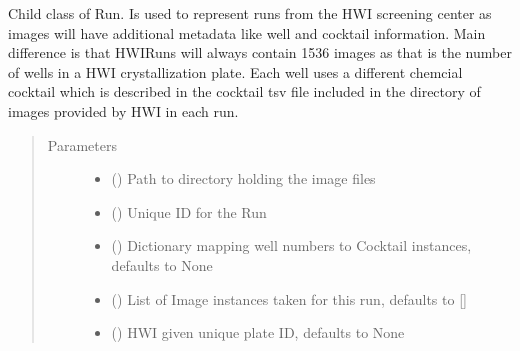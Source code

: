 \documentclass[letterpaper,10pt,english]{sphinxmanual}
\begin{document}
\begin{fulllineitems}
\begin{fulllineitems}
\label{\detokenize{polo.crystallography:polo.crystallography.run.HWIRun.AllOWED_PLOTS}}
Child class of Run. Is used to represent runs from the HWI screening center
as images will have additional metadata like well and cocktail information.
Main difference is that HWIRuns will always contain 1536 images as that is
the number of wells in a HWI crystallization plate. Each well uses a
different chemcial cocktail which is described in the cocktail tsv file
included in the directory of images provided by HWI in each run.
\begin{quote}\begin{description}
\item[{Parameters}] \leavevmode\begin{itemize}
\item {} 
 () \textendash{} Path to directory holding the image files

\item {} 
 () \textendash{} Unique ID for the Run

\item {} 
 (\sphinxstyleliteralemphasis{\sphinxupquote{, }}) \textendash{} Dictionary mapping well numbers to
Cocktail instances, defaults to None

\item {} 
 (\sphinxstyleliteralemphasis{\sphinxupquote{, }}) \textendash{} List of Image instances taken for this run, defaults to {[}{]}

\item {} 
 (\sphinxstyleliteralemphasis{\sphinxupquote{, }}) \textendash{} HWI given unique plate ID, defaults to None


\end{itemize}
\end{description}
\end{quote}
\end{fulllineitems}
\end{fulllineitems}
\end{document}

